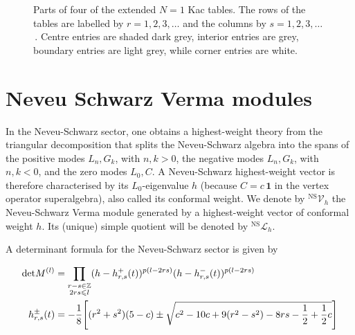 \documentclass[a4paper,reqno,12pt]{report}
\theoremstyle{definition}
\newcommand{\Z}{\mathbb{Z}}
\numberwithin{equation}{section}
\let\originalleft\left     %
\let\originalright\right
\renewcommand{\left}{\mathopen{}\mathclose\bgroup\originalleft}
\renewcommand{\right}{\aftergroup\egroup\originalright}
\newcommand{\BKL}{\cellcolor[gray]{0.8}} %
\newcommand{\IKL}{\cellcolor[gray]{0.6}} %
\newcommand{\CKL}{\cellcolor[gray]{0.4}} %
\newcommand{\wun}{\mathbf{1}}  %
\newcommand{\Ver}[1]{\mathcal{V}_{#1}}       %
\newcommand{\Irr}[1]{\mathcal{L}_{#1}}       %
\newcommand{\hw}{highest-weight}
\newcommand{\ns}{Neveu-Schwarz}
\renewcommand{\le}{\leqslant}
\theoremstyle{plain}
\newcommand{\hwv}{\hw{} vector}
\newcommand{\NSVer}[1]{{}^{\text{NS}}\Ver{#1}}     %
\newcommand{\NSIrr}[1]{{}^{\text{NS}}\Irr{#1}}     %
\begin{document}
{\begin{figure}
\begin{center}
{
}
\caption{Parts of four of the extended $N=1$ Kac tables.  The rows of the tables are labelled by $r = 1, 2, 3, \ldots$ and the columns by $s = 1, 2, 3, \ldots$\,.  Centre entries are shaded dark grey, interior entries are grey, boundary entries are light grey, while corner entries are white.} \label{fig:KacTables}
\end{center}
\end{figure}
}

\section{Neveu Schwarz Verma modules} \label{sec:Verma}

In the \ns{} sector, one obtains a \hw{} theory from the triangular decomposition that splits the \ns{} algebra into the spans of the positive modes $L_n, G_k$, with $n,k>0$, the negative modes $L_n, G_k$, with $n,k<0$, and the zero modes $L_0, C$.  A \ns{} \hwv{} is therefore characterised by its $L_0$-eigenvalue $h$ (because $C = c \, \wun$ in the vertex operator superalgebra), also called its conformal weight.  We denote by $\NSVer{h}$ the \ns{} Verma module generated by a \hwv{} of conformal weight $h$.  Its (unique) simple quotient will be denoted by $\NSIrr{h}$.

A determinant formula for the Neveu-Schwarz sector is given by 

\begin{align*}
\text{det} M^{(l)} &= \prod_{\substack{r-s \in\Z \\ 2rs\le l}} (h - h_{r,s}^+ (t))^{p(l-2rs)}(h - h_{r,s}^- (t))^{p(l-2rs)}\\
h_{r,s}^{\pm}(t)  &= -\frac{1}{8}\left[(r^2+s^2)(5-c)\pm\sqrt{c^2-10c+9(r^2-s^2)-8rs-\frac{1}{2}+\frac{1}{2}c}\right]
\end{align*}
\end{document}
